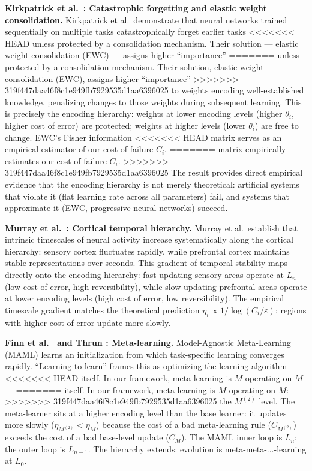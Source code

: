 \documentclass[11pt]{article}
\theoremstyle{definition}
\begin{document}
\textbf{Kirkpatrick et al.\ \cite{Kirkpatrick2017}: Catastrophic
forgetting and elastic weight consolidation.}
Kirkpatrick et al.\ demonstrate that neural networks trained
sequentially on multiple tasks catastrophically forget earlier tasks
<<<<<<< HEAD
unless protected by a consolidation mechanism. Their solution ---
elastic weight consolidation (EWC) --- assigns higher ``importance''
=======
unless protected by a consolidation mechanism. Their solution,
elastic weight consolidation (EWC), assigns higher ``importance''
>>>>>>> 319f447daa46f8c1e949fb7929535d1aa6396025
to weights encoding well-established knowledge, penalizing changes to
those weights during subsequent learning. This is precisely the
encoding hierarchy: weights at lower encoding levels (higher
$\theta_i$, higher cost of error) are protected; weights at higher
levels (lower $\theta_i$) are free to change. EWC's Fisher information
<<<<<<< HEAD
matrix serves as an empirical estimator of our cost-of-failure $C_i$.
=======
matrix empirically estimates our cost-of-failure $C_i$.
>>>>>>> 319f447daa46f8c1e949fb7929535d1aa6396025
The result provides direct empirical evidence that the encoding
hierarchy is not merely theoretical: artificial systems that violate
it (flat learning rate across all parameters) fail, and systems that
approximate it (EWC, progressive neural networks) succeed.

\textbf{Murray et al.\ \cite{Murray2014}: Cortical temporal
hierarchy.}
Murray et al.\ establish that intrinsic timescales of neural
activity increase systematically along the cortical hierarchy: sensory
cortex fluctuates rapidly, while prefrontal cortex maintains stable
representations over seconds. This gradient of temporal stability maps
directly onto the encoding hierarchy: fast-updating sensory areas
operate at $L_n$ (low cost of error, high reversibility), while
slow-updating prefrontal areas operate at lower encoding levels (high
cost of error, low reversibility). The empirical timescale gradient
matches the theoretical prediction $\eta_i \propto 1/\log(C_i /
\varepsilon)$: regions with higher cost of error update more slowly.

\textbf{Finn et al.\ \cite{FinnEtAl2017} and Thrun \cite{Thrun1998}:
Meta-learning.}
Model-Agnostic Meta-Learning (MAML) learns an initialization from
which task-specific learning converges rapidly. ``Learning to learn''
\cite{Thrun1998} frames this as optimizing the learning algorithm
<<<<<<< HEAD
itself. In our framework, meta-learning is $M$ operating on $M$ ---
=======
itself. In our framework, meta-learning is $M$ operating on $M$:
>>>>>>> 319f447daa46f8c1e949fb7929535d1aa6396025
the $M^{(2)}$ level. The meta-learner sits at a higher encoding level
than the base learner: it updates more slowly ($\eta_{M^{(2)}} <
\eta_M$) because the cost of a bad meta-learning rule ($C_{M^{(2)}}$)
exceeds the cost of a bad base-level update ($C_M$). The MAML inner
loop is $L_n$; the outer loop is $L_{n-1}$. The hierarchy extends:
evolution is meta-meta-$\ldots$-learning at $L_0$.
\end{document}
